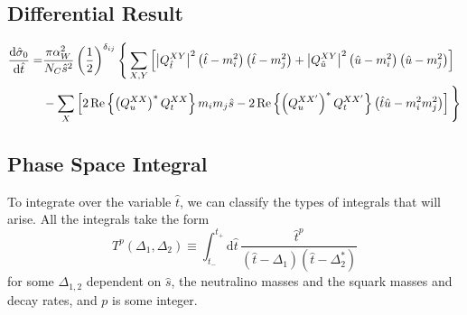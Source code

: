\documentclass[../main.tex]{subfiles}
\begin{document}
\subsection{Differential Result}
\begin{align}
	\nonumber
	\d[\hat{t}]{\hat{\sigma}_0} = & \frac{\pi \alpha_W^2}{N_C \hat{s}^2} \pclosed{\frac{1}{2}}^{\delta_{ij}} \Bigg\{ \sum_{X,Y} \bclosed{\abs{Q^{XY}_{\hat{t}}}^2 \pclosed{\hat{t}-m_i^2}\pclosed{\hat{t}-m_j^2} + \abs{Q^{XY}_{\hat{u}}}^2 \pclosed{\hat{u}-m_i^2}\pclosed{\hat{u}-m_j^2}} \\
	                              & - \sum_X \bclosed{2\Re{\pclosed{Q_{u}^{XX}}^\ast Q_{t}^{XX}} m_i m_j \hat{s} - 2\Re{\pclosed{Q_{u}^{XX^\prime}}^\ast Q_{t}^{XX^\prime}} \pclosed{\hat{t}\hat{u} - m_i^2m_j^2}} \Bigg\}
\end{align}

\subsection{Phase Space Integral}
To integrate over the variable \(\hat{t}\), we can classify the types of
integrals that will arise. All the integrals take the form
\begin{equation}
	T^p(\Delta_1, \Delta_2) \equiv \int_{t_-}^{t_+} \!\mathrm{d}\hat{t}\, \frac{\hat{t}^p}{(\hat{t}-\Delta_1)(\hat{t}-\Delta_2^\ast)}
\end{equation}
for some \(\Delta_{1,2}\) dependent on \(\hat{s}\), the neutralino masses and the squark masses and decay rates, and \(p\) is some integer.
\end{document}
